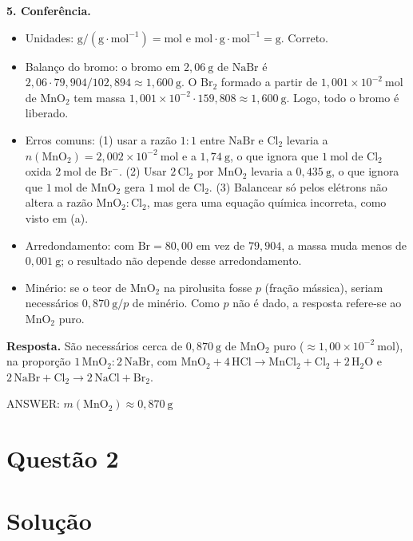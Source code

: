 \documentclass{article}%
\begin{document}
\textbf{5. Conferência.}
\begin{itemize}
\item Unidades: $\mathrm{g}/(\mathrm{g\cdot mol^{-1}}) = \mathrm{mol}$ e $\mathrm{mol}\cdot\mathrm{g\cdot mol^{-1}} = \mathrm{g}$. Correto.
\item Balanço do bromo: o bromo em $2{,}06\ \mathrm{g}$ de $\mathrm{NaBr}$ é $2{,}06\cdot 79{,}904/102{,}894 \approx 1{,}600\ \mathrm{g}$. O $\mathrm{Br_2}$ formado a partir de $1{,}001\times 10^{-2}\ \mathrm{mol}$ de $\mathrm{MnO_2}$ tem massa $1{,}001\times 10^{-2}\cdot 159{,}808 \approx 1{,}600\ \mathrm{g}$. Logo, todo o bromo é liberado.
\item Erros comuns: (1) usar a razão $1:1$ entre $\mathrm{NaBr}$ e $\mathrm{Cl_2}$ levaria a $n(\mathrm{MnO_2}) = 2{,}002\times 10^{-2}\ \mathrm{mol}$ e a $1{,}74\ \mathrm{g}$, o que ignora que $1\ \mathrm{mol}$ de $\mathrm{Cl_2}$ oxida $2\ \mathrm{mol}$ de $\mathrm{Br^{-}}$. (2) Usar $2\,\mathrm{Cl_2}$ por $\mathrm{MnO_2}$ levaria a $0{,}435\ \mathrm{g}$, o que ignora que $1\ \mathrm{mol}$ de $\mathrm{MnO_2}$ gera $1\ \mathrm{mol}$ de $\mathrm{Cl_2}$. (3) Balancear só pelos elétrons não altera a razão $\mathrm{MnO_2 : Cl_2}$, mas gera uma equação química incorreta, como visto em (a).
\item Arredondamento: com $\mathrm{Br} = 80{,}00$ em vez de $79{,}904$, a massa muda menos de $0{,}001\ \mathrm{g}$; o resultado não depende desse arredondamento.
\item Minério: se o teor de $\mathrm{MnO_2}$ na pirolusita fosse $p$ (fração mássica), seriam necessários $0{,}870\ \mathrm{g}/p$ de minério. Como $p$ não é dado, a resposta refere-se ao $\mathrm{MnO_2}$ puro.
\end{itemize}

\textbf{Resposta.} São necessários cerca de $0{,}870\ \mathrm{g}$ de $\mathrm{MnO_2}$ puro ($\approx 1{,}00\times 10^{-2}\ \mathrm{mol}$), na proporção $1\,\mathrm{MnO_2} : 2\,\mathrm{NaBr}$, com $\mathrm{MnO_2} + 4\,\mathrm{HCl} \rightarrow \mathrm{MnCl_2} + \mathrm{Cl_2} + 2\,\mathrm{H_2O}$ e $2\,\mathrm{NaBr} + \mathrm{Cl_2} \rightarrow 2\,\mathrm{NaCl} + \mathrm{Br_2}$.

ANSWER: $m(\mathrm{MnO_2}) \approx 0{,}870\ \mathrm{g}$%
\newpage%
\section*{Questão 2}

\section*{Solução}
\end{document}

